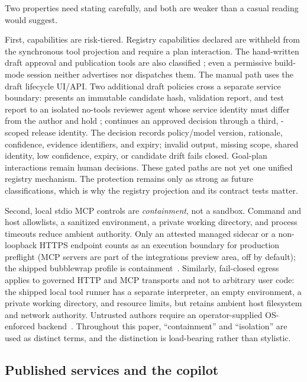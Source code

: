 Two properties need stating carefully, and both are weaker than a casual reading
would suggest.

First, \aria{} capabilities are risk-tiered. Registry capabilities declared
 are withheld from the synchronous tool projection and require a plan
interaction. The hand-written draft approval and publication tools are also
classified ; even a permissive build-mode session neither advertises nor
dispatches them. The manual path uses the draft lifecycle UI/API. Two additional
draft policies cross a separate service boundary:  presents an
immutable candidate hash, validation report, and test report to an isolated
no-tools reviewer agent whose service identity must differ from the author and hold
\approver{};  continues an approved decision through a third,
\operator{}-scoped release identity. The decision records policy/model version,
rationale, confidence, evidence identifiers, and expiry; invalid output, missing
scope, shared identity, low confidence, expiry, or candidate drift fails closed.
Goal-plan  interactions remain human decisions. These gated paths are
not yet one unified registry mechanism. The protection remains only as
strong as future classifications, which is why the registry projection and its
contract tests matter.

Second, local stdio MCP controls are \emph{containment}, not a sandbox. Command and
host allowlists, a sanitized environment, a private working directory, and process
timeouts reduce ambient authority. Only an attested managed sidecar or a
non-loopback HTTPS endpoint counts as an execution boundary for production
preflight (MCP servers are part of the integrations preview area, off by default); the shipped bubblewrap profile is containment~\cite{bubblewrap}.
Similarly, fail-closed egress applies to governed HTTP and MCP transports and not
to arbitrary user code: the shipped local tool runner has a separate interpreter,
an empty environment, a private working directory, and resource limits, but retains
ambient host filesystem and network authority. Untrusted authors require an
operator-supplied OS-enforced backend~\cite{agache2020firecracker}. Throughout this
paper, ``containment'' and ``isolation'' are used as distinct terms, and the
distinction is load-bearing rather than stylistic.

\subsection{Published services and the copilot}


